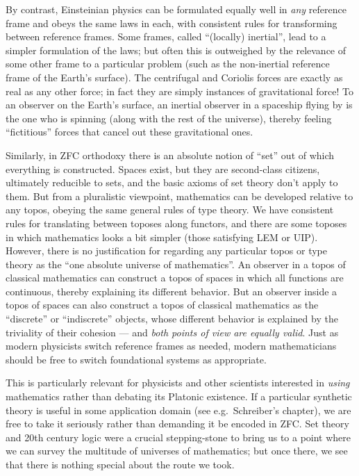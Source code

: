 \documentclass[12pt]{article}
\numberwithin{equation}{section}
\begin{document}
By contrast, Einsteinian physics can be formulated equally well in \emph{any} reference frame and obeys the same laws in each, with consistent rules for transforming between reference frames. %
Some frames, called ``(locally) inertial'', lead to a simpler formulation of the laws; but often this is outweighed by the relevance of some other frame to a particular problem (such as the non-inertial reference frame of the Earth's surface).
The centrifugal and Coriolis forces are exactly as real as any other force; in fact they are simply instances of gravitational force!
To an observer on the Earth's surface, an inertial observer in a spaceship flying by is the one who is spinning (along with the rest of the universe), thereby feeling ``fictitious'' forces that cancel out these gravitational ones.

Similarly, in ZFC orthodoxy there is an absolute notion of ``set'' out of which everything is constructed.
Spaces exist, but they are second-class citizens, ultimately reducible to sets, and the basic axioms of set theory don't apply to them.
But from a pluralistic viewpoint, mathematics can be developed relative to any topos, obeying the same general rules of type theory.
We have consistent rules for translating between toposes along functors, %
and there are some toposes in which mathematics looks a bit simpler (those satisfying LEM or UIP).
However, there is no justification for regarding any particular topos or type theory as the ``one absolute universe of mathematics''.
An observer in a topos of classical mathematics can construct a topos of spaces in which all functions are continuous, thereby explaining its different behavior.
But an observer inside a topos of spaces can also construct a topos of classical mathematics as the ``discrete'' or ``indiscrete'' objects, whose different behavior is explained by the triviality of their cohesion --- and \emph{both points of view are equally valid}.
Just as modern physicists switch reference frames as needed, modern mathematicians should be free to switch foundational systems as appropriate.

This is particularly relevant for physicists and other scientists interested in \emph{using} mathematics rather than debating its Platonic existence.
If a particular synthetic theory is useful in some application domain (see e.g.\ Schreiber's chapter), we are free to take it seriously rather than demanding it be encoded in ZFC.
Set theory and 20th century logic were a crucial stepping-stone to bring us to a point where we can survey the multitude of universes of mathematics; but once there, we see that there is nothing special about the route we took.




\end{document}
